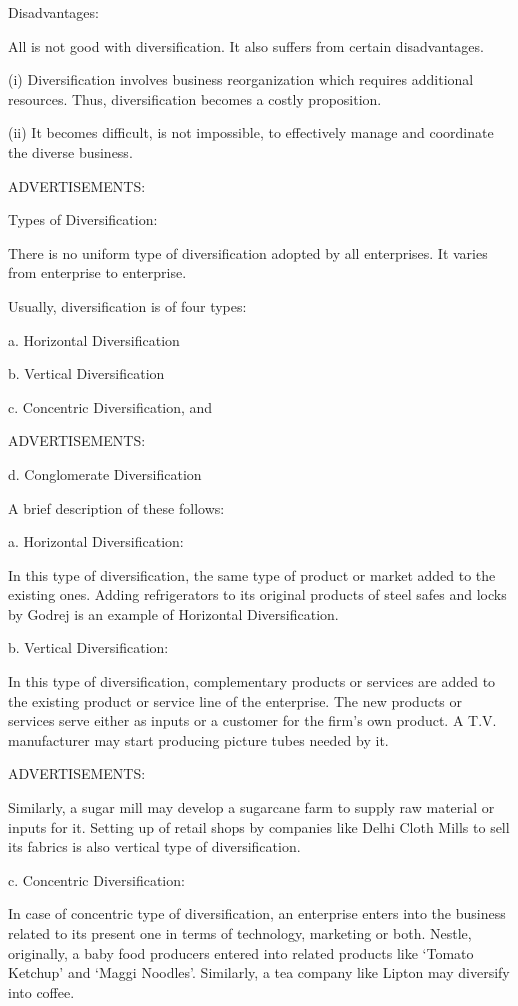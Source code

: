 \documentclass{article}
\begin{document}
Disadvantages:

All is not good with diversification. It also suffers from certain disadvantages.

(i) Diversification involves business reorganization which requires additional resources. Thus, diversification becomes a 
costly proposition.

(ii) It becomes difficult, is not impossible, to effectively manage and coordinate the diverse business.

ADVERTISEMENTS:

Types of Diversification:

There is no uniform type of diversification adopted by all enterprises. It varies from enterprise to enterprise.

Usually, diversification is of four types:

a. Horizontal Diversification

b. Vertical Diversification

c. Concentric Diversification, and

ADVERTISEMENTS:

d. Conglomerate Diversification

A brief description of these follows:

a. Horizontal Diversification:

In this type of diversification, the same type of product or market added to the existing ones. Adding refrigerators to its
 original products of steel safes and locks by Godrej is an example of Horizontal Diversification.

b. Vertical Diversification:

In this type of diversification, complementary products or services are added to the existing product or service line of the 
enterprise. The new products or services serve either as inputs or a customer for the firm’s own product. A T.V. manufacturer may start producing picture tubes needed by it.

ADVERTISEMENTS:

Similarly, a sugar mill may develop a sugarcane farm to supply raw material or inputs for it. Setting up of retail shops by 
companies like Delhi Cloth Mills to sell its fabrics is also vertical type of diversification.

c. Concentric Diversification:

In case of concentric type of diversification, an enterprise enters into the business related to its present one in terms of 
technology, marketing or both. Nestle, originally, a baby food producers entered into related products like ‘Tomato Ketchup’ 
and ‘Maggi Noodles’. Similarly, a tea company like Lipton may diversify into coffee.
\end{document}
